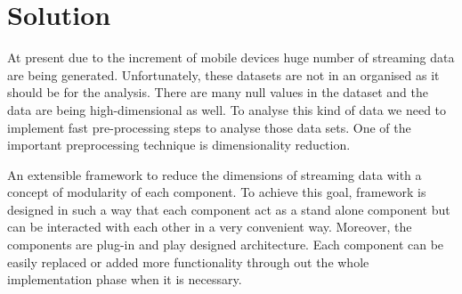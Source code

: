 \chapter{Solution}
\label{cha:solutioni}


At present due to the increment of mobile devices huge number of streaming data are being generated. Unfortunately, these datasets are not in an organised as it should be for the analysis. There are many null values in the dataset and the data are being high-dimensional as well. To analyse this kind of data we need to implement fast pre-processing steps to analyse those data sets. One of the important preprocessing technique is dimensionality reduction. 

An extensible framework to reduce the dimensions of streaming data with a concept of modularity of each component. To achieve this goal, framework is designed in such a way that each component act as a stand alone component but can be interacted with each other in a very convenient way. Moreover, the components are  plug-in and play designed architecture. Each component can be easily replaced or added more functionality through out the whole implementation phase when it is necessary.

